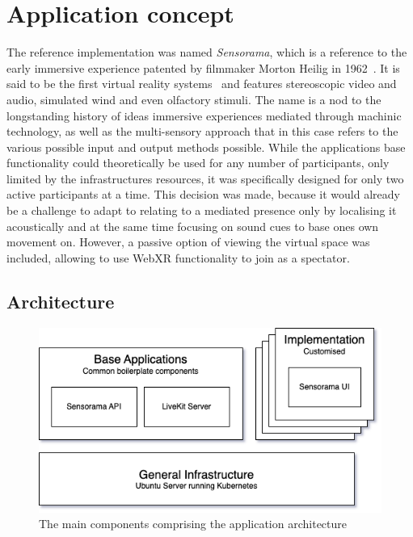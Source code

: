 \chapter{Application concept}
\label{ch:concept}

The reference implementation was named \emph{Sensorama}, which is a reference to the early immersive experience patented by filmmaker Morton Heilig in 1962~\parencite{Heilig_1962}.
It is said to be the first virtual reality systems~\parencite[5][]{vrHistoryGigante} and features stereoscopic video and audio, simulated wind and even olfactory stimuli.
The name is a nod to the longstanding history of ideas immersive experiences mediated through machinic technology, as well as the multi-sensory approach that in this case refers to the various possible input and output methods possible.
While the application\textsinglequote s base functionality could theoretically be used for any number of participants, only limited by the infrastructure\textquotesingle s resources, it was specifically designed for only two active participants at a time.
This decision was made, because it would already be a challenge to adapt to relating to a mediated presence only by localising it acoustically and at the same time focusing on sound cues to base one\textquotesingle s own movement on.
However, a passive option of viewing the virtual space was included, allowing to use \ac{WebXR} functionality to join as a spectator.

\section{Architecture}
\label{sec:architecture}

\begin{figure}[h]
\centering
\includegraphics[scale=0.5]{04_Artefakte/01_Abbildungen/sensorama-stack}
\caption[Sensorama stack diagram]{The main components comprising the application architecture\protect}
\label{fig:sensoramaStack}
\end{figure}


